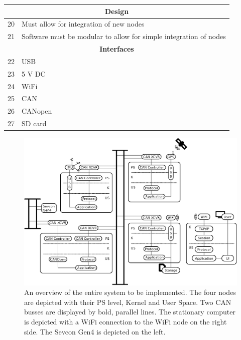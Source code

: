 \begin{table}[H]
\begin{tabular}{ |p{0.3cm}|p{10.5cm}| }
\hline
\multicolumn{2}{|c|}{\textbf{Design}}\\
\hline	
20 & Must allow for integration of new nodes		 					 \\
21 & Software must be modular to allow for simple integration of nodes	 \\

\hline
\multicolumn{2}{|c|}{\textbf{Interfaces}}\\
\hline	
22 & USB 		 						\\
23 & 5 V DC		 						\\
24 & WiFi	 							\\
25 & CAN 		 						\\
26 & CANopen 		 					\\
27 & SD card 		 					\\
\hline
\end{tabular}
\end{table}

\newpage
\begin{figure}[!h]
	\centering
	\includegraphics[angle=90,width=\textwidth]{graphics/analysis_complex.eps}
	\caption[An overview of the entire system to be implemented.]{An overview of the entire system to be implemented. The four nodes are depicted with their PS level, Kernel and User Space. Two CAN busses are displayed by bold, parallel lines. The stationary computer is depicted with a WiFi connection to the WiFi node on the right side. The Sevcon Gen4 is depicted on the left.}
	\label{fig:complete_system}
\end{figure}


